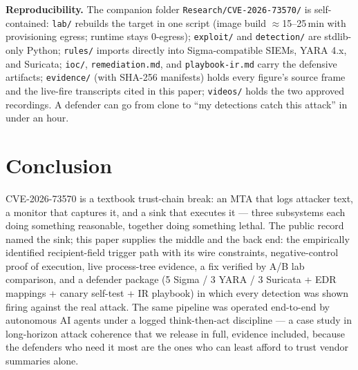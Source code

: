 \documentclass[journal]{IEEEtran}
\begin{document}
\textbf{Reproducibility.} The companion folder
\texttt{Research/CVE-2026-73570/} is self-contained: \texttt{lab/}
rebuilds the target in one script (image build $\approx$15--25\,min with
provisioning egress; runtime stays 0-egress); \texttt{exploit/} and
\texttt{detection/} are stdlib-only Python; \texttt{rules/} imports
directly into Sigma-compatible SIEMs, YARA 4.x, and Suricata;
\texttt{ioc/}, \texttt{remediation.md}, and \texttt{playbook-ir.md} carry
the defensive artifacts; \texttt{evidence/} (with SHA-256 manifests) holds
every figure's source frame and the live-fire transcripts cited in this
paper; \texttt{videos/} holds the two approved recordings. A defender can
go from clone to ``my detections catch this attack'' in under an hour.

\section{Conclusion}
\label{sec:conclusion}

CVE-2026-73570 is a textbook trust-chain break: an MTA that logs attacker
text, a monitor that captures it, and a sink that executes it — three
subsystems each doing something reasonable, together doing something
lethal. The public record named the sink; this paper supplies the middle
and the back end: the empirically identified recipient-field trigger path
with its wire constraints, negative-control proof of execution, live
process-tree evidence, a fix verified by A/B lab comparison, and a
defender package (5 Sigma / 3 YARA / 3 Suricata + EDR mappings + canary
self-test + IR playbook) in which every detection was shown firing against
the real attack. The same pipeline was operated end-to-end by autonomous AI
agents under a logged think-then-act discipline — a case study in
long-horizon attack coherence that we release in full, evidence included,
because the defenders who need it most are the ones who can least afford
to trust vendor summaries alone.
\end{document}
